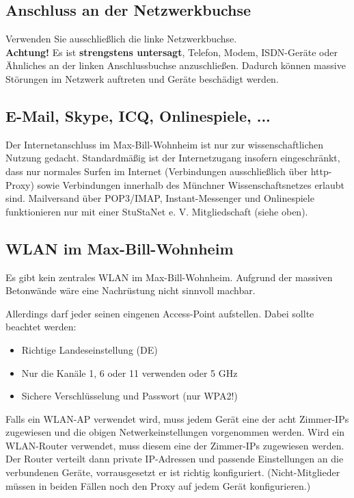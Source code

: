 \documentclass[a4paper,12pt]{scrartcl}
\begin{document}
\subsection*{Anschluss an der Netzwerkbuchse}

Verwenden Sie ausschließlich die linke Netzwerkbuchse. 
\\ \textbf{Achtung!} Es ist \textbf{strengstens untersagt}, Telefon, Modem, ISDN-Geräte oder Ähnliches an der linken Anschlussbuchse anzuschließen. Dadurch können massive Störungen im Netzwerk auftreten und Geräte beschädigt werden. 

\subsection*{E-Mail, Skype, ICQ, Onlinespiele, ...}

Der Internetanschluss im Max-Bill-Wohnheim ist nur zur wissenschaftlichen Nutzung gedacht.
Standardmäßig ist der Internetzugang insofern eingeschränkt, dass nur normales Surfen im Internet (Verbindungen ausschließlich über http-Proxy) sowie Verbindungen innerhalb des Münchner Wissenschaftsnetzes erlaubt sind. Mailversand über POP3/IMAP, Instant-Messenger und Onlinespiele funktionieren nur mit einer StuStaNet e. V. Mitgliedschaft (siehe oben).

\subsection*{WLAN im Max-Bill-Wohnheim}
Es gibt kein zentrales WLAN im Max-Bill-Wohnheim. Aufgrund der massiven Betonwände wäre eine Nachrüstung nicht sinnvoll machbar.

Allerdings darf jeder seinen eingenen Access-Point aufstellen. Dabei sollte beachtet werden:
\begin{itemize}
    \item Richtige Landeseinstellung (DE)
    \item Nur die Kanäle 1, 6 oder 11 verwenden oder 5 GHz
    \item Sichere Verschlüsselung und Passwort (nur WPA2!)
\end{itemize}

Falls ein WLAN-AP verwendet wird, muss jedem Gerät eine der acht Zimmer-IPs zugewiesen und die obigen Netwerkeinstellungen vorgenommen werden. Wird ein WLAN-Router verwendet, muss diesem eine der Zimmer-IPs zugewiesen werden. Der Router verteilt dann private IP-Adressen und passende Einstellungen an die verbundenen Geräte, vorrausgesetzt er ist richtig konfiguriert. (Nicht-Mitglieder müssen in beiden Fällen noch den Proxy auf jedem Gerät konfigurieren.)
\end{document}
